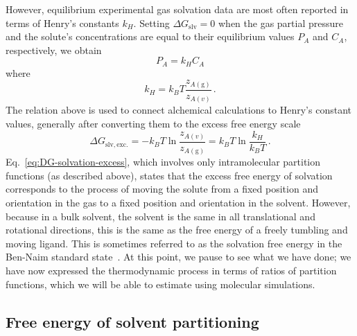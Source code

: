 \documentclass[9pt,bestpractices]{livecoms}
\begin{document}
However, equilibrium experimental gas solvation data are most often reported in terms of Henry's constants $k_H$. Setting $\Delta G_{\mathrm{slv}} = 0$ when the gas partial pressure and the solute's concentrations are equal to their equilibrium values $P_A$ and $C_A$, respectively, we obtain
\begin{equation}
  P_A = k_H C_A
  \label{eq:Henrys-law}
\end{equation}
where
\begin{equation}
  k_H = k_B T \frac{z_{A(\mathrm{g})}}{z_{A(v)}} \, .
  \label{eq:Henrys-constant}
\end{equation}
The relation above is used to connect alchemical calculations to Henry's constant values, generally after converting them to the excess free energy scale~\cite{cabani1981group,nicholls2008predicting,mobley2014freesolv}
\begin{equation}
\Delta G_{\mathrm{slv, exc.}} = - k_B T \ln \frac{z_{A(v)}}{z_{A(\mathrm{g})}} = k_B T \ln \frac{k_H}{k_B T} \, .
\label{eq:DG-solvation-excess}
\end{equation}
Eq.~\ref{eq:DG-solvation-excess}, which involves only intramolecular partition functions (as described above),  states that the excess free energy of solvation corresponds to the process of moving the solute from a fixed position and orientation in the gas to a fixed position and orientation in the solvent. However, because in a bulk solvent, the solvent is the same in all translational and rotational directions, this is the same as the free energy of a freely tumbling and moving ligand. This is sometimes referred to as the solvation free energy in the Ben-Naim standard state~\cite{bennaim1984solvation}.  At this point, we pause to see what we have done; we have now expressed the thermodynamic process in terms of ratios of partition functions, which we will be able to estimate using molecular simulations.

\subsection{Free energy of solvent partitioning}\label{sec:theory-partitioning}
\end{document}
